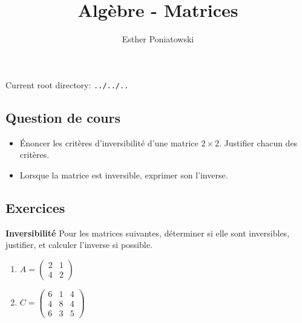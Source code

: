 \documentclass[10pt,a4paper]{article}
\title{Algèbre - Matrices}
\author{Esther Poniatowski}
\date{}
\providecommand{\rootpath}{../../..}
\begin{document}
\maketitle
Current root directory: \texttt{\rootpath}

\subsection*{Question de cours}
\begin{itemize}
    \item Énoncer les critères d'inversibilité d'une matrice $2 \times 2$. Justifier chacun des critères.
    \item Lorsque la matrice est inversible, exprimer son l'inverse.
\end{itemize}

\bigskip

\subsection*{Exercices}

\textbf{Inversibilité}
Pour les matrices suivantes, déterminer si elle sont inversibles, justifier, et calculer l'inverse
si possible.
\begin{enumerate}
    \item $A = \begin{pmatrix} 2 & 1 \\ 4 & 2 \end{pmatrix}$
    \item $C = \begin{pmatrix}
        6 & 1 & 4 \\
        4 & 8 & 4 \\
        6 & 3 & 5
        \end{pmatrix}$
\end{enumerate}

\bigskip
\end{document}

